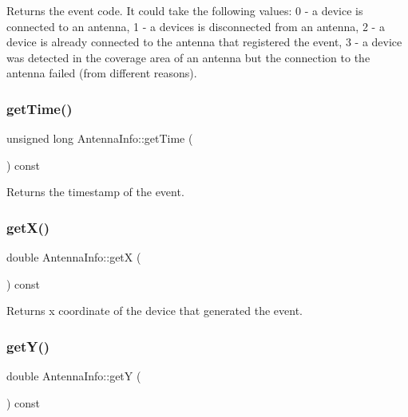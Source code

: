 \begin{DoxyReturn}{Returns}
the event code. It could take the following values\+: 0 -\/ a device is connected to an antenna, 1 -\/ a devices is disconnected from an antenna, 2 -\/ a device is already connected to the antenna that registered the event, 3 -\/ a device was detected in the coverage area of an antenna but the connection to the antenna failed (from different reasons). 
\end{DoxyReturn}
\mbox{\label{class_antenna_info_aaae1e1105ba4a724c0061e3f7904b1e5}} 
\subsubsection{\texorpdfstring{get\+Time()}{getTime()}}
{\footnotesize\ttfamily unsigned long Antenna\+Info\+::get\+Time (\begin{DoxyParamCaption}{ }\end{DoxyParamCaption}) const}

\begin{DoxyReturn}{Returns}
the timestamp of the event. 
\end{DoxyReturn}
\mbox{\label{class_antenna_info_a3817cba0231888dc5977105ace0faddb}} 
\subsubsection{\texorpdfstring{get\+X()}{getX()}}
{\footnotesize\ttfamily double Antenna\+Info\+::getX (\begin{DoxyParamCaption}{ }\end{DoxyParamCaption}) const}

\begin{DoxyReturn}{Returns}
x coordinate of the device that generated the event. 
\end{DoxyReturn}
\mbox{\label{class_antenna_info_aa385e3e85d783b81d69014a64b5fc94f}} 
\subsubsection{\texorpdfstring{get\+Y()}{getY()}}
{\footnotesize\ttfamily double Antenna\+Info\+::getY (\begin{DoxyParamCaption}{ }\end{DoxyParamCaption}) const}

